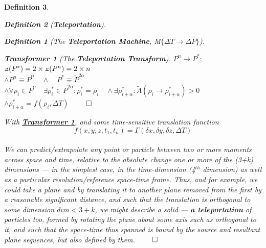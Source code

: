 \documentclass[a4paper, 18pt]{book} %
\newtheorem{defn}{Definition}
\newtheorem{transf}{Transformer}
\newcommand{\invpi}{\rotatebox[origin=c]{180}{$\pi$}}
\begin{document}
\begin{appendices}
\begin{defn}
\begin{defn}[\textbf{Teleportation}]
\begin{defn}[The \textbf{Teleportation Machine}, M$\{\Delta T \rightarrow \Delta P\}$]
\begin{transf}[The \textbf{Teleportation Transform}]
\label{TRANSFTELEP}
$P^{n} \rightarrow P^* ;$\\
$\invpi(P^*) = 2 \times \invpi(P^{n}) = 2 \times n$\\
$\land P^n \equiv \ddot{P}^{\alpha} \quad \land \quad P^* \equiv \ddot{P}^{2\alpha}$\\
$\land \forall \rho_i \in \ddot{P}^{\alpha} \quad \exists \rho^*_i \in \ddot{P}^{2\alpha} : \rho^*_i = \rho_i \quad \land \exists \rho^*_{i+\alpha} : \tilde{A}(\rho_i \rightarrow \rho^*_{i+\alpha}) > 0$\\
$\land \rho^*_{i+\alpha} = f(\rho_i,\Delta T)$
$\qed$\\
\end{transf}
\end{defn}

\end{defn}

With \textbf{\hyperref[TRANSFTELEP]{Transformer \ref{TRANSFTELEP}}}, and some time-sensitive translation function\\ 

\begin{equation}
f({x,y,z,t_1,t_n}) = \Gamma(\delta x,\delta y,\delta z,\Delta T)
\end{equation}\\

We can predict/extrapolate any point or particle between two or more moments across space and time, relative to the absolute change one or more of the (3+k) dimensions --- in the simplest case, in the time-dimension (4$^{th}$ dimension) as well as a particular resolution/reference space-time frame. Thus, and for example, we could take a plane and by translating it to another plane removed from the first by a reasonable significant distance, and such that the translation is orthogonal to some dimension $dim < 3 + k$, we might describe a solid --- \textbf{a teleportation} of particles too, formed by rotating the plane about some axis such as orthogonal to it, and such that the space-time thus spanned is bound by the source and resultant plane sequences, but also defined by them.
$\qed$
\end{defn}



\end{appendices}
\end{document}
